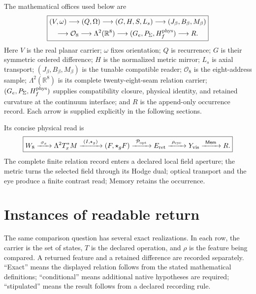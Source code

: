 \documentclass[10pt]{article}
\newcommand{\R}{\mathbb R}
\begin{document}
The mathematical offices used below are
\begin{equation}
\boxed{\begin{gathered}
(V,\omega)\longrightarrow(Q,\Omega)\longrightarrow(G,H,S,L_s)
\longrightarrow(J_\beta,B_\beta,M_\beta)\\
\longrightarrow\mathcal O_8\longrightarrow\Lambda^2(\R^8)
\longrightarrow(G_e,P_\Sigma,H_f^{\rm phys})\longrightarrow R.
\end{gathered}}
\end{equation}
Here $V$ is the real planar carrier; $\omega$ fixes orientation; $Q$ is recurrence; $G$ is their symmetric ordered difference; $H$ is the normalized metric mirror; $L_s$ is axial transport; $(J_\beta,B_\beta,M_\beta)$ is the tunable compatible reader; $\mathcal O_8$ is the eight-address sample; $\Lambda^2(\R^8)$ is its complete twenty-eight-seam relation carrier; $(G_e,P_\Sigma,H_f^{\rm phys})$ supplies compatibility closure, physical identity, and retained curvature at the continuum interface; and $R$ is the append-only occurrence record. Each arrow is supplied explicitly in the following sections.

Its concise physical read is
\begin{equation}
\boxed{W_8\xrightarrow{\ \sigma_x\ }\Lambda^2T_x^*M
\xrightarrow{\ (I,\star_g)\ }(F,\star_gF)
\xrightarrow{\ \mathcal P_{\rm opt}\ }E_{\rm ret}
\xrightarrow{\ \rho_{\rm eye}\ }Y_{\rm vis}\xrightarrow{\ \mathsf{Mem}\ }R.}
\label{eq:physicalnormal}
\end{equation}
The complete finite relation record enters a declared local field aperture; the
metric turns the selected field through its Hodge dual; optical transport and
the eye produce a finite contrast read; Memory retains the occurrence.

\section{Instances of readable return}
The same comparison question has several exact realizations. In each row, the carrier is the set of states, $T$ is the declared operation, and $\rho$ is the feature being compared. A returned feature and a retained difference are recorded separately. ``Exact'' means the displayed relation follows from the stated mathematical definitions; ``conditional'' means additional native hypotheses are required; ``stipulated'' means the result follows from a declared recording rule.
\end{document}
